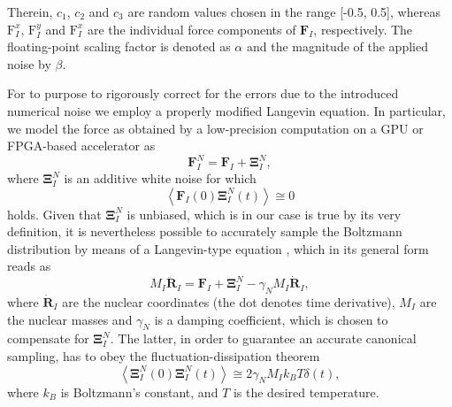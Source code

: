 Therein, $c_1$, $c_2$ and $c_3$ are random values chosen in the range [-0.5, 0.5], whereas $\text{F}_{I}^{x}$, $\text{F}_{I}^{y}$ and $\text{F}_{I}^{x}$ are the individual force components of $\textbf{F}_{I}$, respectively. The floating-point scaling factor is denoted as $\alpha$ and the magnitude of the applied noise by \(\beta\).

For to purpose to rigorously correct for the errors due to the introduced numerical noise we employ a properly modified Langevin equation. In particular, we model the force as obtained by a low-precision computation on a GPU or FPGA-based accelerator as 
\begin{equation} \label{fFPGA}
\textbf{F}_{I}^{N} = \textbf{F}_{I} + \mathbf{\Xi }_{I}^{N}, 
\end{equation}
where $\mathbf{\Xi }_{I}^{N}$ is an additive white noise for which
\begin{equation} \label{CrossCorr}
 \left \langle \textbf{F}_{I}\left ( 0 \right ) \mathbf{\Xi } _{I}^{N}\left ( t \right )\right \rangle \cong  0
\end{equation}
holds. Given that $\mathbf{\Xi }_{I}^{N}$ is unbiased, which is in our case is true by its very definition, it is nevertheless possible to accurately sample the Boltzmann distribution by means of a Langevin-type equation \cite{Krajewski,Richters,Karhan}, which in its general form reads as
\begin{equation} \label{LangevinEq}
M_{I}\ddot{\textbf{R}}_{I}=\textbf{F}_{I}+\mathbf{\Xi }_{I}^{N}-\gamma _{N}M_{I}\dot{\textbf{R}}_{I}, 
\end{equation}
where $\dot{\textbf{R}}_{I}$ are the nuclear coordinates (the dot denotes time derivative), $M_I$ are the nuclear masses and $\gamma _{N}$ is a damping coefficient, 
which is chosen to compensate for \(\mathbf{\Xi }_{I}^{N}\). The latter, in order to guarantee an accurate canonical sampling, has to obey
the fluctuation-dissipation theorem
\begin{equation}
\left \langle \mathbf{\Xi }_{I}^{N}\left ( 0 \right ) \mathbf{\Xi }_{I}^{N}\left ( t \right ) \right \rangle \cong  2 \gamma_{N} M_I k_{B} T  \delta \left ( t \right ), 
\end{equation}  
where $k_B$ is Boltzmann's constant, and $T$ is the desired temperature. 

